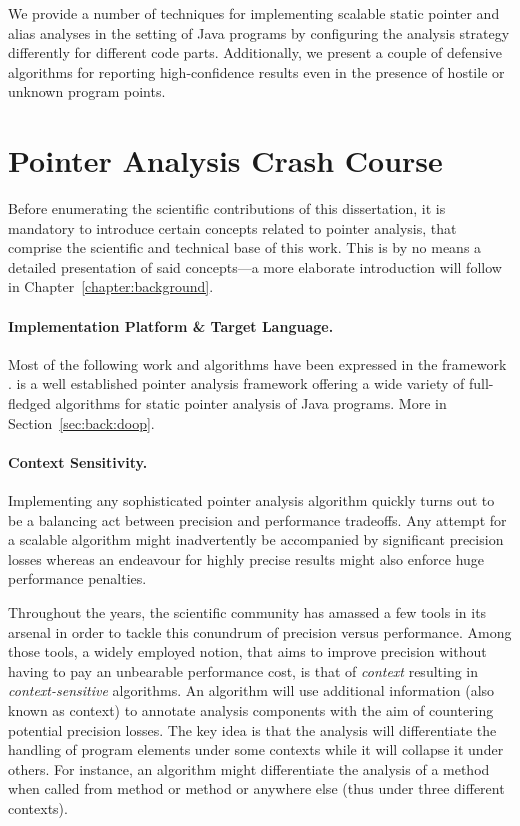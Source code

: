 We provide a number of techniques for implementing scalable static pointer and alias analyses in the setting of Java programs by configuring the analysis strategy differently for different code parts. Additionally, we present a couple of defensive algorithms for reporting high-confidence results even in the presence of hostile or unknown program points.


\section{Pointer Analysis Crash Course}

Before enumerating the scientific contributions of this dissertation, it is mandatory to introduce certain concepts related to pointer analysis, that comprise the scientific and technical base of this work. This is by no means a detailed presentation of said concepts---a more elaborate introduction will follow in Chapter~\ref{chapter:background}.

\paragraph*{Implementation Platform \& Target Language.}
Most of the following work and algorithms have been expressed in the \doop{} framework \cite{oopsla:2009:Bravenboer}. \doop{} is a well established pointer analysis framework offering a wide variety of full-fledged algorithms for static pointer analysis of Java programs. More in Section~\ref{sec:back:doop}.


\paragraph*{Context Sensitivity.}
Implementing any sophisticated pointer analysis algorithm quickly turns out to be a balancing act between precision and performance tradeoffs. Any attempt for a scalable algorithm might inadvertently be accompanied by significant precision losses whereas an endeavour for highly precise results might also enforce huge performance penalties.

Throughout the years, the scientific community has amassed a few tools in its arsenal in order to tackle this conundrum of precision versus performance. Among those tools, a widely employed notion, that aims to improve precision without having to pay an unbearable performance cost, is that of \emph{context} resulting in \emph{context-sensitive} algorithms. An algorithm will use additional information (also known as context) to annotate analysis components with the aim of countering potential precision losses. The key idea is that the analysis will differentiate the handling of program elements under some contexts while it will collapse it under others. For instance, an algorithm might differentiate the analysis of a method when called from method  or method  or anywhere else (thus under three different contexts).

